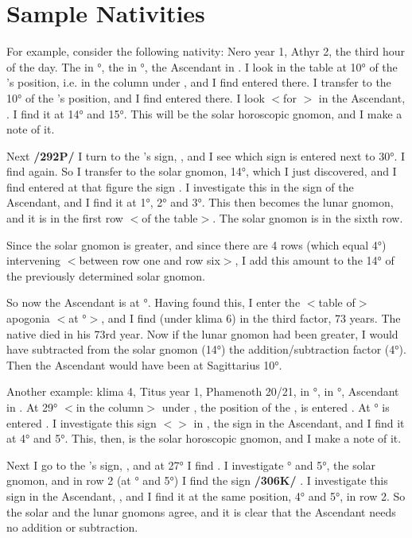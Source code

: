 \section{Sample Nativities}

For example, consider the following nativity: Nero year 1, Athyr 2, the third hour of the day. The \Sun\xspace in \Scorpio\xspace 10°, the \Moon\xspace in \Aquarius\xspace 30°, the Ascendant in \Sagittarius. I look in the table at 10° of the \Sun’s position, i.e. in the column under \Scorpio, and I find \Pisces\xspace entered there. I transfer to \Pisces\xspace the 10° of the \Sun’s position, and I find \Libra\xspace entered there. I look $<$for \Libra$>$ in the Ascendant, \Sagittarius.
I find it at 14° and 15°. This will be the solar horoscopic gnomon, and I make a note of it. 

Next \textbf{/292P/} I turn to the \Moon’s sign, \Aquarius, and I see which sign is entered next to 30°. I find \Aquarius\xspace again. So
I transfer to \Aquarius\xspace the solar gnomon, 14°, which I just discovered, and I find entered at that figure the sign \Sagittarius. I investigate this in the sign of the Ascendant, and I find it at 1°, 2° and 3°. This then becomes the lunar gnomon, and it is in the first row $<$of the table$>$. The solar gnomon is in the sixth row.

Since the solar gnomon is greater, and since there are 4 rows (which equal 4°) intervening $<$between row one and row six$>$, I add this amount to the 14° of the previously determined solar gnomon. 

So now the Ascendant is at \Sagittarius\xspace 18°. Having found this, I enter the $<$table of$>$ apogonia $<$at \Sagittarius\xspace 18°$>$, and I find (under klima 6) in the third factor, 73 years. The native died in his 73rd year. Now if the lunar gnomon had been greater, I would have subtracted from the solar gnomon (14°) the addition/subtraction factor (4°). Then the Ascendant would have been at Sagittarius 10°.

Another example: klima 4, Titus year 1, Phamenoth 20/21, \Sun\xspace in \Pisces\xspace 29°, \Moon\xspace in \Capricorn\xspace 27°, Ascendant in \Scorpio. At 29° $<$in the column$>$ under \Pisces, the position of the \Sun, is entered
\Cancer. At \Cancer\xspace 29° is entered \Capricorn. I investigate this sign $<$\Capricorn$>$ in \Scorpio, the sign in the Ascendant, and I find it at 4° and 5°. This, then, is the solar horoscopic gnomon, and I make a note of it. 

Next I go to the \Moon’s sign, \Capricorn, and at 27° I find \Aries. I investigate \Aries\xspace 4° and 5°, the solar gnomon, and in row 2 (at \Aries\xspace 4° and 5°) I find the sign \textbf{/306K/} \Capricorn. I investigate this sign in the Ascendant, \Scorpio, and I find it at the same position, 4° and 5°, in row 2. So the solar and the lunar gnomons agree, and it is clear that the Ascendant needs no addition or subtraction. 

